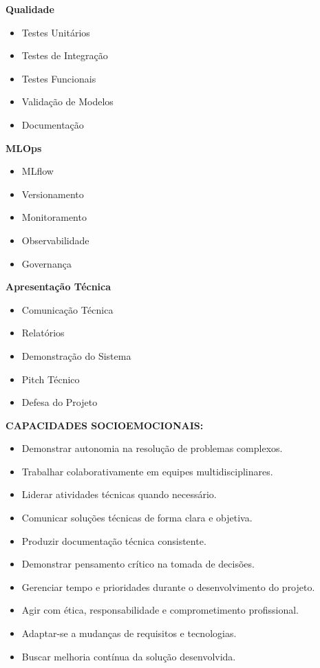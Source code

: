\textbf{Qualidade}

\begin{itemize}
\item Testes Unitários
\item Testes de Integração
\item Testes Funcionais
\item Validação de Modelos
\item Documentação
\end{itemize}

\textbf{MLOps}

\begin{itemize}
\item MLflow
\item Versionamento
\item Monitoramento
\item Observabilidade
\item Governança
\end{itemize}

\textbf{Apresentação Técnica}

\begin{itemize}
\item Comunicação Técnica
\item Relatórios
\item Demonstração do Sistema
\item Pitch Técnico
\item Defesa do Projeto
\end{itemize}

\textbf{CAPACIDADES SOCIOEMOCIONAIS:}

\begin{itemize}
\item Demonstrar autonomia na resolução de problemas complexos.
\item Trabalhar colaborativamente em equipes multidisciplinares.
\item Liderar atividades técnicas quando necessário.
\item Comunicar soluções técnicas de forma clara e objetiva.
\item Produzir documentação técnica consistente.
\item Demonstrar pensamento crítico na tomada de decisões.
\item Gerenciar tempo e prioridades durante o desenvolvimento do projeto.
\item Agir com ética, responsabilidade e comprometimento profissional.
\item Adaptar-se a mudanças de requisitos e tecnologias.
\item Buscar melhoria contínua da solução desenvolvida.
\end{itemize}

